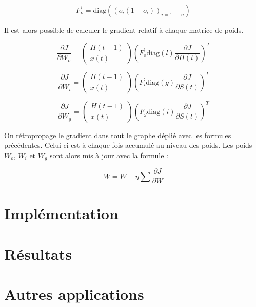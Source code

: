 \documentclass{report}
\theoremstyle{plain}
\theoremstyle{definition}
\theoremstyle{remark}
\begin{document}
\[
F_{o}^{\prime} = \text{diag}((o_{i}(1 - o_{i}))_{i=1,...,n})
\]


Il est alors possible de calculer le gradient relatif à chaque matrice de poids.

\begin{equation}
\frac{\partial J}{\partial W_{o}}=
\begin{pmatrix}
H(t-1) \\
x(t)
\end{pmatrix}
\left(F_{o}^{\prime}\text{diag}(l)\frac{\partial J}{\partial H(t)}\right)^{T}
\end{equation}

\begin{equation}
\frac{\partial J}{\partial W_{i}}=
\begin{pmatrix}
H(t-1) \\
x(t)
\end{pmatrix}
\left(F_{i}^{\prime}\text{diag}(g)\frac{\partial J}{\partial S(t)}\right)^{T}
\end{equation}

\begin{equation}
\frac{\partial J}{\partial W_{g}}=
\begin{pmatrix}
H(t-1) \\
x(t)
\end{pmatrix}
\left(F_{g}^{\prime}\text{diag}(i)\frac{\partial J}{\partial S(t)}\right)^{T}
\end{equation}

On rétropropage le gradient dans tout le graphe déplié avec les formules précédentes. Celui-ci est à chaque fois accumulé au niveau des poids. Les poids $W_{o}$, $W_{i}$ et $W_{g}$ sont alors mis à jour avec la formule :

\begin{equation}
W = W - \eta \sum{\frac{\partial J}{\partial W}}
\end{equation} 

\section{Implémentation}
\section{Résultats}
\section{Autres applications}


\end{document}
